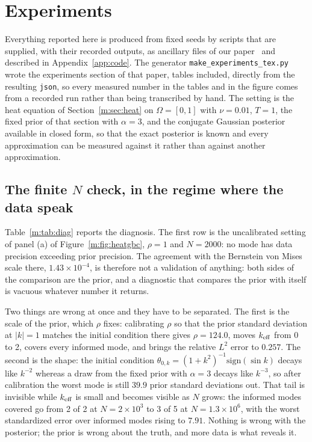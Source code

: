 \section{Experiments}\label{m:sec:experiments}

Everything reported here is produced from fixed seeds by scripts that are supplied, with their recorded outputs, as ancillary files of our paper~\cite{polsonsokolov2026manifold} and described in Appendix~\ref{app:code}. The generator \texttt{make\_experiments\_tex.py} wrote the experiments section of that paper, tables included, directly from the resulting \texttt{json}, so every measured number in the tables and in the figure comes from a recorded run rather than being transcribed by hand. The setting is the heat equation of Section~\ref{m:sec:heat} on $\Omega=[0,1]$ with $\nu=0.01$, $T=1$, the fixed prior of that section with $\alpha=3$, and the conjugate Gaussian posterior available in closed form, so that the exact posterior is known and every approximation can be measured against it rather than against another approximation.

\subsection{The finite $N$ check, in the regime where the data speak}\label{m:sec:expfinite}

Table~\ref{m:tab:diag} reports the diagnosis. The first row is the uncalibrated setting of panel (a) of Figure~\ref{m:fig:heatgbc}, $\rho=1$ and $N=2000$: no mode has data precision exceeding prior precision. The agreement with the Bernstein von Mises scale there, $1.43\times10^{-4}$, is therefore not a validation of anything: both sides of the comparison are the prior, and a diagnostic that compares the prior with itself is vacuous whatever number it returns.

Two things are wrong at once and they have to be separated. The first is the scale of the prior, which $\rho$ fixes: calibrating $\rho$ so that the prior standard deviation at $|k|=1$ matches the initial condition there gives $\rho=124.0$, moves $k_{\rm eff}$ from $0$ to 2, covers every informed mode, and brings the relative $L^2$ error to $0.257$. The second is the shape: the initial condition $\theta_{0,k}=(1+k^2)^{-1}\mathrm{sign}(\sin k)$ decays like $k^{-2}$ whereas a draw from the fixed prior with $\alpha=3$ decays like $k^{-3}$, so after calibration the worst mode is still $39.9$ prior standard deviations out. That tail is invisible while $k_{\rm eff}$ is small and becomes visible as $N$ grows: the informed modes covered go from 2 of 2 at $N=2\times10^3$ to 3 of 5 at $N=1.3\times10^6$, with the worst standardized error over informed modes rising to $7.91$. Nothing is wrong with the posterior; the prior is wrong about the truth, and more data is what reveals it.

